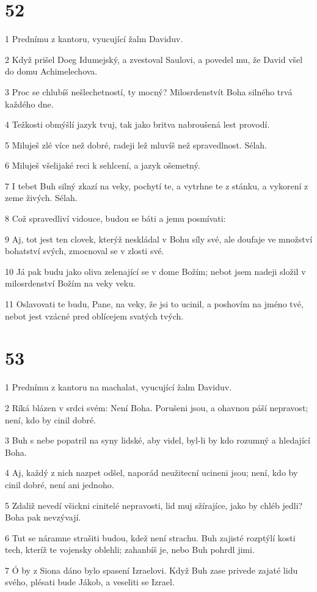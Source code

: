 \chapter{52}

\par 1 Prednímu z kantoru, vyucující žalm Daviduv.
\par 2 Když prišel Doeg Idumejský, a zvestoval Saulovi, a povedel mu, že David všel do domu Achimelechova.
\par 3 Proc se chlubíš nešlechetností, ty mocný? Milosrdenstvít Boha silného trvá každého dne.
\par 4 Težkosti obmýšlí jazyk tvuj, tak jako britva nabroušená lest provodí.
\par 5 Miluješ zlé více než dobré, radeji lež mluvíš než spravedlnost. Sélah.
\par 6 Miluješ všelijaké reci k sehlcení, a jazyk ošemetný.
\par 7 I tebet Buh silný zkazí na veky, pochytí te, a vytrhne te z stánku, a vykorení z zeme živých. Sélah.
\par 8 Což spravedliví vidouce, budou se báti a jemu posmívati:
\par 9 Aj, tot jest ten clovek, kterýž neskládal v Bohu síly své, ale doufaje ve množství bohatství svých, zmocnoval se v zlosti své.
\par 10 Já pak budu jako oliva zelenající se v dome Božím; nebot jsem nadeji složil v milosrdenství Božím na veky veku.
\par 11 Oslavovati te budu, Pane, na veky, že jsi to ucinil, a poshovím na jméno tvé, nebot jest vzácné pred oblícejem svatých tvých.

\chapter{53}

\par 1 Prednímu z kantoru na machalat, vyucující žalm Daviduv.
\par 2 Ríká blázen v srdci svém: Není Boha. Porušeni jsou, a ohavnou páší nepravost; není, kdo by cinil dobré.
\par 3 Buh s nebe popatril na syny lidské, aby videl, byl-li by kdo rozumný a hledající Boha.
\par 4 Aj, každý z nich nazpet odšel, naporád neužitecní ucineni jsou; není, kdo by cinil dobré, není ani jednoho.
\par 5 Zdaliž nevedí všickni cinitelé nepravosti, lid muj sžírajíce, jako by chléb jedli? Boha pak nevzývají.
\par 6 Tut se náramne strašiti budou, kdež není strachu. Buh zajisté rozptýlí kosti tech, kteríž te vojensky oblehli; zahanbíš je, nebo Buh pohrdl jimi.
\par 7 Ó by z Siona dáno bylo spasení Izraelovi. Když Buh zase privede zajaté lidu svého, plésati bude Jákob, a veseliti se Izrael.

